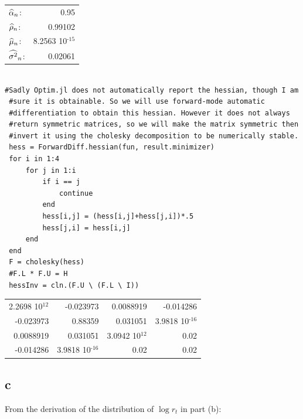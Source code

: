 \documentclass[12pt, letterpaper]{paper}
\begin{document}
\begin{center}
\begin{tabular}{lr}
\(\widehat{ \alpha }_{n}\): & 0.95\\
\(\widehat{ \rho }_{n}\): & 0.99102\\
\(\widehat{ \mu }_{n}\): & 8.2563 \texttimes{} 10\(^{\text{-15}}\)\\
\(\widehat{ \sigma^{2} }_{n}\): & 0.02061\\
\end{tabular}
\end{center}

\begin{verbatim}

#Sadly Optim.jl does not automatically report the hessian, though I am
 #sure it is obtainable. So we will use forward-mode automatic
 #differentiation to obtain this hessian. However it does not always
 #return symmetric matrices, so we will make the matrix symmetric then
 #invert it using the cholesky decomposition to be numerically stable.
 hess = ForwardDiff.hessian(fun, result.minimizer)
 for i in 1:4
     for j in 1:i
         if i == j
             continue
         end
         hess[i,j] = (hess[i,j]+hess[j,i])*.5
         hess[j,i] = hess[i,j]
     end
 end
 F = cholesky(hess)
 #F.L * F.U = H
 hessInv = cln.(F.U \ (F.L \ I))
\end{verbatim}

\begin{center}
\begin{tabular}{rrrr}
2.2698 \texttimes{} 10\(^{\text{12}}\) & -0.023973 & 0.0088919 & -0.014286\\
-0.023973 & 0.88359 & 0.031051 & 3.9818 \texttimes{} 10\(^{\text{-16}}\)\\
0.0088919 & 0.031051 & 3.0942 \texttimes{} 10\(^{\text{12}}\) & 0.02\\
-0.014286 & 3.9818 \texttimes{} 10\(^{\text{-16}}\) & 0.02 & 0.02\\
\end{tabular}
\end{center}

\subsection{c}
\label{sec:orga31d249}
From the derivation of the distribution of $\log r_t$ in part (b):
\end{document}
